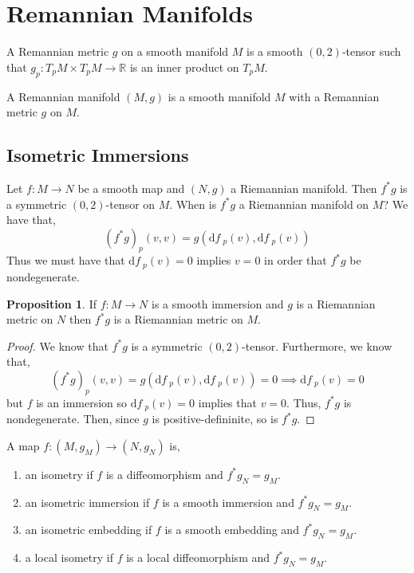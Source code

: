 \documentclass[12pt]{extarticle}
\newcommand{\R}{\mathbb{R}}
\renewcommand{\d}[1]{ \mathrm{d}#1 \:}
\theoremstyle{definition}
\newtheorem{proposition}[theorem]{Proposition}
\newenvironment{definition}[1][Definition:]{\begin{trivlist}
\item[\hskip \labelsep {\bfseries #1}]}{\end{trivlist}}
\begin{document}
\section{Remannian Manifolds}

\begin{definition}
A Remannian metric $g$ on a smooth manifold $M$ is a smooth $(0,2)$-tensor such that $g_p : T_p M \times T_p M \to \R$ is an inner product on $T_p M$. 
\end{definition}

\begin{definition}
A Remannian manifold $(M, g)$ is a smooth manifold $M$ with a Remannian metric $g$ on $M$. 
\end{definition}

\subsection{Isometric Immersions}

Let $f : M \to N$ be a smooth map and $(N, g)$ a Riemannian manifold. Then $f^*g$ is a symmetric $(0,2)$-tensor on $M$. When is $f^* g$ a Riemannian manifold on $M$? We have that,
\[ (f^* g)_p(v, v) = g(\d{f}_p(v), \d{f}_p(v)) \]
Thus we must have that $\d{f}_p(v) = 0$ implies $v = 0$ in order that $f^* g$ be nondegenerate.

\begin{proposition}
If $f : M \to N$ is a smooth immersion and $g$ is a Riemannian metric on $N$ then $f^* g$ is a Riemannian metric on $M$.
\end{proposition}

\begin{proof}
We know that $f^* g$ is a symmetric $(0,2)$-tensor. Furthermore, we know that,
\[ (f^* g)_p(v,v) = g(\d{f}_p(v), \d{f}_p(v)) = 0 \implies \d{f}_p(v) = 0 \]
but $f$ is an immersion so $\d{f}_p(v) = 0$ implies that $v = 0$. Thus, $f^* g$ is nondegenerate. Then, since $g$ is positive-defininite, so is $f^* g$. 
\end{proof}

\begin{definition}
A map $f : (M, g_M) \to (N, g_N)$ is,
\begin{enumerate}
\item an isometry if $f$ is a diffeomorphism and $f^* g_N = g_M$. 
\item an isometric immersion if $f$ is a smooth immersion and $f^* g_N = g_M$.
\item an isometric embedding if $f$ is a smooth embedding and $f^* g_N = g_M$.
\item  a local isometry if $f$ is a local diffeomorphism and $f^* g_N = g_M$. 
\end{enumerate}
\end{definition}
\end{document}
